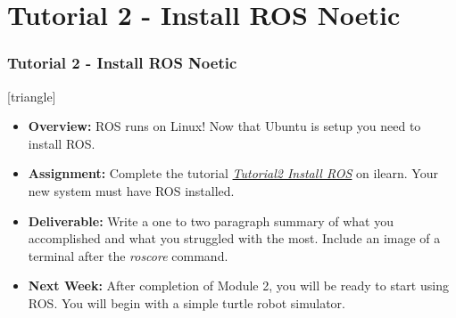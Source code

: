 \documentclass[fleqn]{beamer} %
\newcommand{\sectiontitleV}{Tutorial 2 - Install ROS Noetic}
\begin{document}
\section{\sectiontitleV}	
	            \begin{frame}[label=sectionV] \small
		\frametitle{\sectiontitleV}    
	
 [triangle]
                \begin{itemize}

					\item {\bf Overview:} ROS runs on Linux! Now that Ubuntu is setup you need to install ROS. 		

					\item {\bf Assignment:} Complete the tutorial \href{https://github.com/thillRobot/ros_workshop/blob/main/module2/tutorial2_install_ros/tutorial2_install_ros.md}{\it Tutorial2 Install ROS} on ilearn. Your new system must have ROS \rosDistro \hspace{1mm} installed.
                    
                    \item {\bf Deliverable:} Write a one to two paragraph summary of what you accomplished and what you struggled with the most. Include an image of a terminal after the {\it roscore} command. 
    
                    \item {\bf Next Week:} After completion of Module 2, you will be ready to start using ROS. You will begin with a simple turtle robot simulator. \vspc
                               
                \end{itemize}
		\end{frame}
\end{document}
